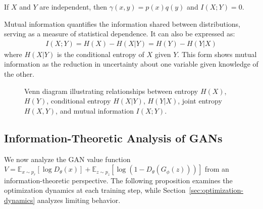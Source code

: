 \begin{theorem}
  If $X$ and $Y$ are independent, then $\gamma(x,y) = p(x)q(y)$ and $I(X; Y) = 0$.
\end{theorem}

\begin{remark}
  Mutual information quantifies the information shared between distributions, serving as a measure of statistical dependence. It can also be expressed as:
  \begin{align}
    \label{eq:mutual-information-alt}
    I(X; Y) = H(X) - H(X | Y) = H(Y) - H(Y | X)
  \end{align}
  where $H(X | Y)$ is the conditional entropy of $X$ given $Y$. This form shows mutual information as the reduction in uncertainty about one variable given knowledge of the other.
\end{remark}

\begin{figure}[h!]
  \centering
  \caption{Venn diagram illustrating relationships between entropy $H(X)$, $H(Y)$, conditional entropy $H(X|Y)$, $H(Y|X)$, joint entropy $H(X,Y)$, and mutual information $I(X;Y)$.}%
  \label{fig:venn-information}
\end{figure}

\subsection{Information-Theoretic Analysis of GANs}%
\label{sec:info-value-function}%

We now analyze the GAN value function $V = \mathbb{E}_{x \sim p_r}[\log D_\theta(x)] + \mathbb{E}_{z \sim p_z}[\log(1 - D_\theta(G_\phi(z)))]$ from an information-theoretic perspective. The following proposition examines the optimization dynamics at each training step, while Section~\ref{sec:optimization-dynamics} analyzes limiting behavior.

